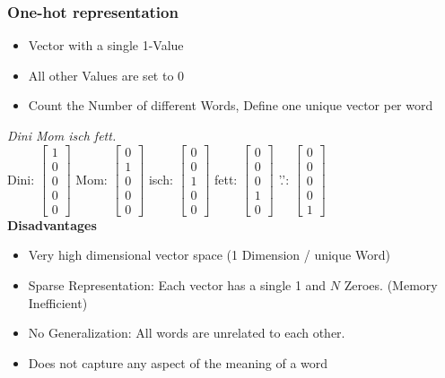 \subsubsection{One-hot representation}
\begin{itemize}
    \item Vector with a single 1-Value
    \item All other Values are set to 0
    \item Count the Number of different Words, Define one unique vector per word
\end{itemize}
\textit{Dini Mom isch fett.}\\
Dini: $\begin{bmatrix} 1\\ 0\\ 0\\ 0\\ 0\end{bmatrix}$
Mom: $\begin{bmatrix} 0\\ 1\\ 0\\ 0\\ 0\end{bmatrix}$
isch: $\begin{bmatrix} 0\\ 0\\ 1\\ 0\\ 0\end{bmatrix}$
fett: $\begin{bmatrix} 0\\ 0\\ 0\\ 1\\ 0\end{bmatrix}$
'.': $\begin{bmatrix} 0\\ 0\\ 0\\ 0\\ 1\end{bmatrix}$\\
\textbf{Disadvantages}
\begin{itemize}
    \item Very high dimensional vector space (1 Dimension / unique Word)
    \item Sparse Representation: Each vector has a single 1 and $N$ Zeroes. (Memory Inefficient)
    \item No Generalization: All words are unrelated to each other.
    \item Does not capture any aspect of the meaning of a word
\end{itemize}

